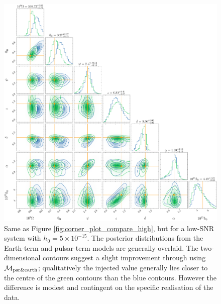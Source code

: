 \documentclass[fleqn,usenatbib,useAMS]{mnras}
\begin{document}
\begin{figure}
	\includegraphics[width=\textwidth, height =\textwidth ]{images/corner_lowSNR_compare_n4000}
	\caption{Same as Figure \ref{fig:corner_plot_compare_high}, but for a low-SNR system with $h_0 = 5 \times 10^{-15}$. The posterior distributions from the Earth-term and pulsar-term models are generally overlaid. The two-dimensional contours suggest a slight improvement through using $\mathcal{M}_{\rm psr \& earth}$; qualitatively the injected value generally lies closer to the centre of the green contours than the blue contours. However the difference is modest and contingent on the specific realisation of the data.}
	\label{fig:corner_plot_compare_low}
\end{figure}
\end{document}
